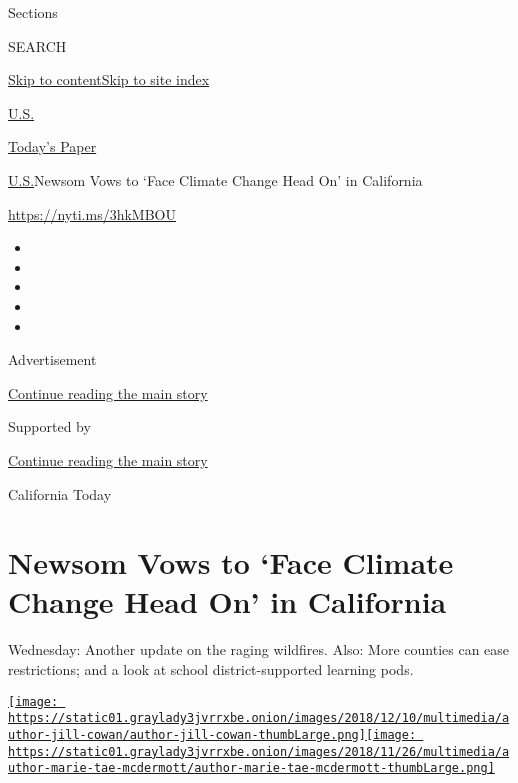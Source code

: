 Sections

SEARCH

\protect\hyperlink{site-content}{Skip to
content}\protect\hyperlink{site-index}{Skip to site index}

\href{https://www.nytimes3xbfgragh.onion/section/us}{U.S.}

\href{https://myaccount.nytimes3xbfgragh.onion/auth/login?response_type=cookie\&client_id=vi}{}

\href{https://www.nytimes3xbfgragh.onion/section/todayspaper}{Today's
Paper}

\href{/section/us}{U.S.}\textbar{}Newsom Vows to `Face Climate Change
Head On' in California

\url{https://nyti.ms/3hkMBOU}

\begin{itemize}
\item
\item
\item
\item
\item
\end{itemize}

Advertisement

\protect\hyperlink{after-top}{Continue reading the main story}

Supported by

\protect\hyperlink{after-sponsor}{Continue reading the main story}

California Today

\hypertarget{newsom-vows-to-face-climate-change-head-on-in-california}{%
\section{Newsom Vows to `Face Climate Change Head On' in
California}\label{newsom-vows-to-face-climate-change-head-on-in-california}}

Wednesday: Another update on the raging wildfires. Also: More counties
can ease restrictions; and a look at school district-supported learning
pods.

\href{https://www.nytimes3xbfgragh.onion/by/jill-cowan}{\texttt{[image: https://static01.graylady3jvrrxbe.onion/images/2018/12/10/multimedia/author-jill-cowan/author-jill-cowan-thumbLarge.png]}}\href{https://www.nytimes3xbfgragh.onion/by/marie-tae-mcdermott}{\texttt{[image: https://static01.graylady3jvrrxbe.onion/images/2018/11/26/multimedia/author-marie-tae-mcdermott/author-marie-tae-mcdermott-thumbLarge.png]}}

